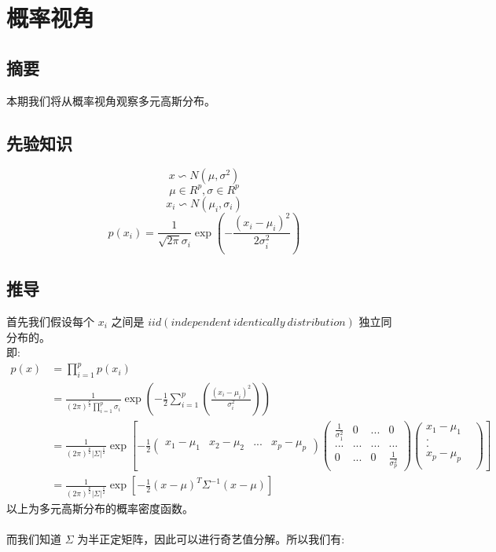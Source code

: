 \documentclass{report}
\begin{document}
\section{概率视角}
\subsection{摘要}
本期我们将从概率视角观察多元高斯分布。
\subsection{先验知识}
$$
x \backsim N(\mu, \sigma^2)
$$
$$
\mu \in R^p, \sigma \in R^p
$$
$$
x_i \backsim N(\mu_i, \sigma_i)
$$
$$
p(x_i) = \frac{1}{\sqrt{2\pi}\sigma_i} \exp(-\frac{(x_i - \mu_i)^2}{2\sigma_i^2})
$$
\subsection{推导}
首先我们假设每个 $x_i$ 之间是 $iid (independent\ identically\ distribution)$ 独立同分布的。\\
即:
$$
\begin{aligned}
p(x)
&=\prod_{i=1}^p p(x_i)\\
&=\frac{1}{(2\pi)^{\frac{p}{2}}\prod_{i=1}^p \sigma_i} \exp(-\frac{1}{2}\sum_{i=1}^p (\frac{(x_i-\mu_i)^2}{\sigma_i^2}))\\
&=\frac{1}{(2\pi)^{\frac{p}{2}}|\Sigma|^{\frac{1}{2}}} \exp[-\frac{1}{2}
\left (
\begin{matrix}
x_1-\mu_1 & x_2-\mu_2 & ... & x_p - \mu_p
\end{matrix}
\right )
\left (
\begin{matrix}
\frac{1}{\sigma_1^2} & 0 & ... & 0 \\
... & ... & ... & ... \\
0 & ... & 0 & \frac{1}{\sigma_p^2}
\end{matrix}
\right )
\left (
\begin{matrix}
x_1-\mu_1\\
.&\\
.&\\
x_p-\mu_p\\
\end{matrix}
\right )]\\
&=\frac{1}{(2\pi)^{\frac{p}{2}}|\Sigma|^{\frac{1}{2}}} \exp[-\frac{1}{2}(x-\mu)^T \Sigma^{-1}(x-\mu)]
\end{aligned}
$$
以上为多元高斯分布的概率密度函数。\\\\
而我们知道 $\Sigma$ 为半正定矩阵，因此可以进行奇艺值分解。所以我们有:
\end{document}
